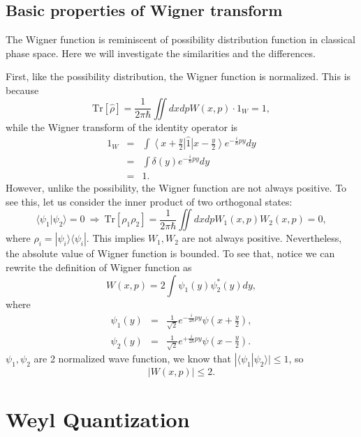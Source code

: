 \documentclass[aps,prb,superscriptaddress]{revtex4}
\begin{document}
\subsection{Basic properties of Wigner transform}
The Wigner function is reminiscent of possibility distribution function in classical phase space. Here we will investigate the similarities and the differences.

First, like the possibility distribution, the Wigner function is normalized. This is because
\begin{equation}
	\mathrm{Tr}[\hat \rho] = \frac{1}{2\pi \hbar}\iint dxdp W(x,p) \cdot 1_W = 1,
\end{equation}
while the Wigner transform of the identity operator is
\begin{eqnarray}
	1_W
	&=& \int \left\langle x+\frac{y}{2}\right| \hat 1 \left|x-\frac{y}{2} \right\rangle e^{-\frac{i}{\hbar}py} dy \nonumber \\
	&=& \int \delta(y) e^{-\frac{i}{\hbar}py} dy \nonumber \\	&=& 1.
\end{eqnarray}
However, unlike the possibility, the Wigner function are not always positive. To see this, let us consider the inner product of two orthogonal states:
\begin{equation}
	\langle \psi_1| \psi_2\rangle = 0\ \Longrightarrow
	\ \mathrm{Tr}\left[\rho_1\rho_2 \right] = \frac{1}{2\pi \hbar} \iint dxdp W_1(x,p)W_2(x,p)=0,
\end{equation}
where $\rho_i = |\psi_i\rangle\langle \psi_i|$. This implies $W_1,W_2$ are not always positive. Nevertheless, the absolute value of Wigner function is bounded. To see that, notice we can rewrite the definition of Wigner function as
\begin{equation}
	W(x,p) = 2 \int \psi_1(y)\psi_2^{*}(y) dy,
\end{equation}
where
\begin{eqnarray}
	\psi_1(y) &=& \frac{1}{\sqrt{2}}e^{-\frac{i}{2\hbar}py} \psi\left(x+\frac{y}{2}\right), \\
	\psi_2(y) &=& \frac{1}{\sqrt{2}}e^{+\frac{i}{2\hbar}py} \psi\left(x-\frac{y}{2}\right).
\end{eqnarray}
$\psi_1,\psi_2$ are 2 normalized wave function, we know that $|\langle\psi_1|\psi_2\rangle| \le 1$, so
\begin{equation}
	|W(x,p)| \le 2.
\end{equation}



\section{Weyl Quantization}
\end{document}
